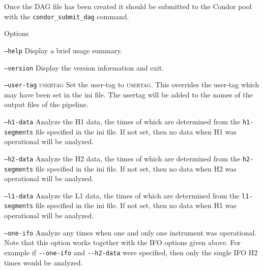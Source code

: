 \begin{entry}
Once the DAG file has been created it should be submitted to the Condor pool
with the \verb$condor_submit_dag$ command.

\item[Options]\leavevmode
\begin{entry}
\item[\texttt{--help}] Display a brief usage summary.
\end{entry}
  
\begin{entry}
\item[\texttt{--version}] Display the version information and exit.
\end{entry}
  
\begin{entry}
\item[\texttt{--user-tag} \textsc{usertag}] Set the user-tag to \textsc{usertag}.  This overrides the user-tag which may have been set in the ini file.  The usertag will be added to the names of the output files of the pipeline.
\end{entry}
  
\begin{entry}
\item[\texttt{--h1-data}] Analyze the H1 data, the times of which are
determined from the \verb$h1-segments$ file specified in the ini file.  If not
set, then no data when H1 was operational will be analyzed.
\end{entry}

\begin{entry}
\item[\texttt{--h2-data}] Analyze the H2 data, the times of which are
determined from the \verb$h2-segments$ file specified in the ini file.  If not
set, then no data when H2 was operational will be analyzed.
\end{entry}

\begin{entry}
\item[\texttt{--l1-data}] Analyze the L1 data, the times of which are
determined from the \verb$l1-segments$ file specified in the ini file.  If not
set, then no data when H1 was operational will be analyzed.
\end{entry}

\begin{entry}
\item[\texttt{--one-ifo}] Analyze any times when one and only one instrument
was operational.  Note that this option works together with the IFO options
given above.  For example if \verb$--one-ifo$ and \verb$--h2-data$ were
specified, then only the single IFO H2 times would be analyzed.
\end{entry}


\end{entry}
